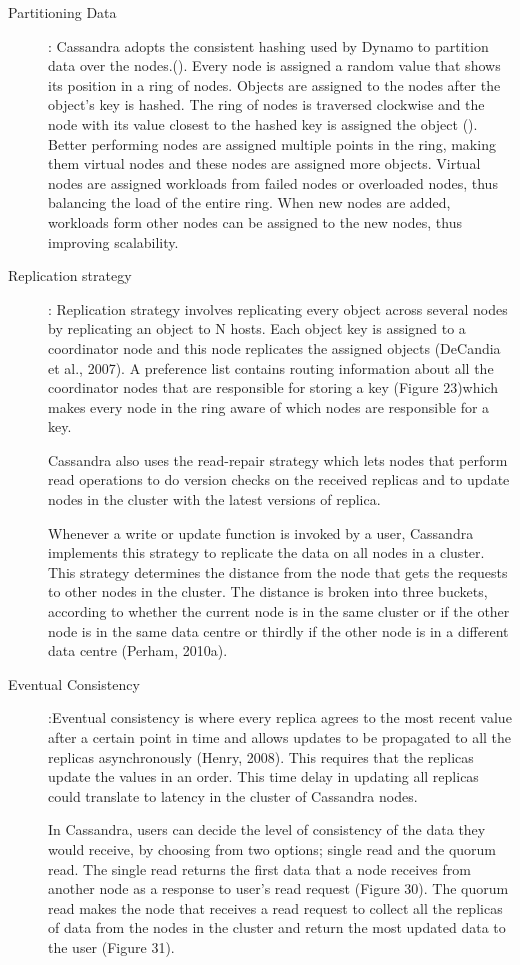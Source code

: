 \begin{description}
  \item  [Partitioning Data]: Cassandra adopts the consistent hashing used by
  Dynamo to partition data over the nodes.(). Every node is  assigned a random value that shows its position in a
  ring of nodes. Objects are assigned to the nodes after the object's key is
  hashed. The ring of nodes is traversed clockwise and the node with its value
  closest to the hashed key is assigned the object (). Better
  performing nodes are assigned multiple points in the ring, making them virtual
  nodes and these nodes are assigned more objects. Virtual nodes are
  assigned workloads from failed nodes or overloaded nodes, thus balancing the
  load of the entire ring. When new nodes are added, workloads form other nodes
  can be assigned to the new nodes, thus improving scalability.
  
  \item  [Replication strategy]: Replication strategy involves replicating every
  object across several nodes by replicating an object to N hosts. Each object
  key is assigned to a coordinator node and this node replicates the assigned
  objects (DeCandia et al., 2007). A preference list 
  contains routing information about all the coordinator nodes that are
  responsible for storing a key (Figure 23)which makes every node in the ring
  aware of which nodes are responsible for a key.
  
  Cassandra also uses the read-repair strategy which lets nodes
  that perform read operations to do version checks on the received replicas and to
  update nodes in the cluster with the latest versions of replica.
  
  Whenever a write or update function is invoked by a user, Cassandra implements
  this strategy to replicate the data on all nodes in a cluster. This
  strategy determines the distance from the node that gets the requests to other
  nodes in the cluster. The distance is broken into three buckets, according to
  whether the current node is in the same cluster or if the other node is in the
  same data centre or thirdly if the other node is in a different data centre
  (Perham, 2010a).
  
  \item [Eventual Consistency]:Eventual consistency is where every replica
  agrees to the most recent value after a certain point in time and allows
  updates to be propagated to all the replicas asynchronously (Henry, 2008).
  This requires that the replicas update the values in an order. This time delay
  in updating all replicas could translate to latency in the cluster of
  Cassandra nodes.
  
  In Cassandra, users can decide the level of consistency of the data they would
  receive, by choosing from two options; single read and the
  quorum read. The single read returns the first data that a node receives from
  another node as a response to user's read request (Figure 30). The quorum read
  makes the node that receives a read request to collect all the replicas of
  data from the nodes in the cluster and return the most updated data to the
  user (Figure 31).
  
\end{description}
